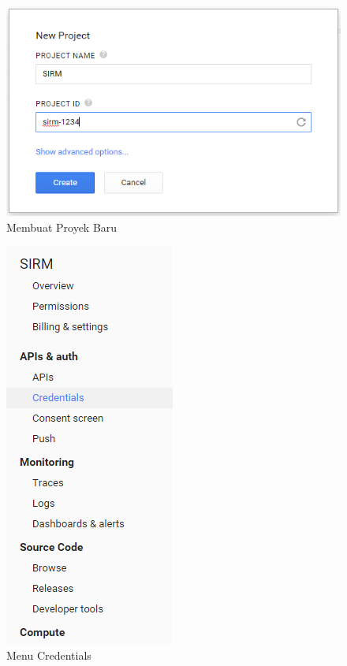 \begin{figure}[H]
\centering
\includegraphics[scale=0.7]{Gambar/newproject.png}
\caption[Membuat Proyek Baru]{Membuat Proyek Baru} 
\label{fig:newproject}
\end{figure}

\begin{figure}[H]
\centering
\includegraphics[scale=0.7]{Gambar/credentials.png}
\caption[Menu Credentials]{Menu Credentials} 
\label{fig:credentials}
\end{figure}


